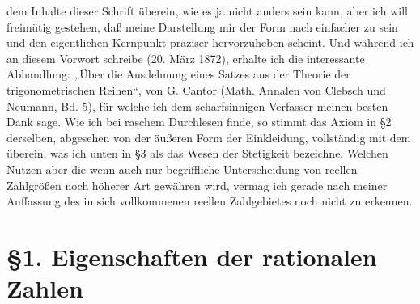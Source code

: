 \documentclass[11pt]{article}
\begin{document}
dem Inhalte dieser Schrift überein, wie es ja nicht anders sein kann, aber ich will freimütig gestehen, daß meine Darstellung mir der Form nach einfacher zu sein und den eigentlichen Kernpunkt präziser hervorzuheben scheint. Und während ich an diesem Vorwort schreibe (20. März 1872), erhalte ich die interessante Abhandlung: „Über die Ausdehnung eines Satzes aus der Theorie der trigonometrischen Reihen“, von G. Cantor (Math. Annalen von Clebsch und Neumann, Bd. 5), für welche ich dem scharfsinnigen Verfasser meinen besten Dank sage. Wie ich bei raschem Durchlesen finde, so stimmt das Axiom in \S 2 derselben, abgesehen von der äußeren Form der Einkleidung, vollständig mit dem überein, was ich unten in \S 3 als das Wesen der Stetigkeit bezeichne. Welchen Nutzen aber die wenn auch nur begriffliche Unterscheidung von reellen Zahlgrößen noch höherer Art gewähren wird, vermag ich gerade nach meiner Auffassung des in sich vollkommenen reellen Zahlgebietes noch nicht zu erkennen.

\section*{\S 1. Eigenschaften der rationalen Zahlen}
\end{document}

